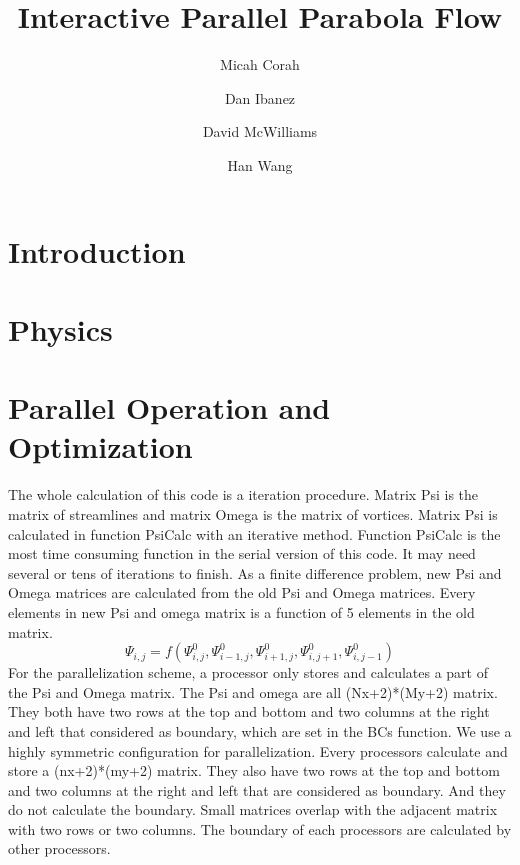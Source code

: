 \documentclass[twocolumn]{article}
\title{Interactive Parallel Parabola Flow}
\author{
Micah Corah
\and
Dan Ibanez
\and
David McWilliams
\and
Han Wang
}
\begin{document}
\maketitle
\section{Introduction}
\section{Physics}
\section{Parallel Operation and Optimization}
The whole calculation of this code is a iteration procedure.
Matrix Psi is the matrix of streamlines and matrix Omega is the matrix of vortices.
Matrix Psi is calculated in function PsiCalc with an iterative method.
Function PsiCalc is the most time consuming function in the serial version
of this code.
It may need several or tens of iterations to finish.
As a finite difference problem, new Psi and Omega matrices are calculated from
the old Psi and Omega matrices.
Every elements in new Psi and omega matrix is a function of 5 elements in the old
matrix.
\[\Psi_{i,j}=f(\Psi^0_{i,j},\Psi^0_{i-1,j},\Psi^0_{i+1,j},\Psi^0_{i,j+1},\Psi^0_{i,j-1})\]
For the parallelization scheme, a processor only stores and calculates a part
of the Psi and Omega matrix.
The Psi and omega are all (Nx+2)*(My+2) matrix.
They both have two rows at the top and bottom and two columns at the right
and left that considered as boundary, which are set in the BCs function.
We use a highly symmetric configuration for parallelization.
Every processors calculate and store a (nx+2)*(my+2) matrix.
They also have  two rows at the top and bottom and two columns at the right
and left that are considered as boundary.
And they do not calculate the boundary.
Small matrices  overlap with the adjacent matrix with two rows or two columns.
The boundary of each processors are calculated by other processors.
\end{document}
